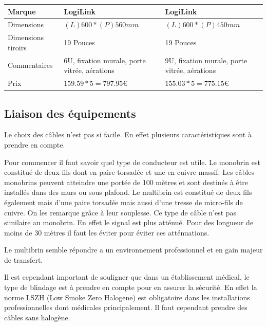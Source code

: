     \begin{center}
        \begin{tabular}{|l|p{5cm}|p{5cm}|}
          \hline
            Marque  & LogiLink
    &   LogiLink
 \\
          \hline
Dimensions
  &
$(L)600 * (P)560 mm$
    & $ (L)600 * (P)450 mm $

 \\
          \hline
Dimensions tiroirs
  & 19 Pouces
    & 19 Pouces
 \\
          \hline
            Commentaires   & 6U, fixation murale, porte vitrée, aérations & 9U, fixation murale, porte vitrée, aérations
                  \\
        \hline
            Prix &
$ 159.59 * 5 = 797.95  \euro   $
    &
$ 155.03 * 5 = 775.15 \euro   $
 \\
          \hline
        \end{tabular}
    \end{center}





\subsection{Liaison des équipements}

Le choix des câbles n'est pas si facile. En effet plusieurs caractéristiques sont à prendre en compte.

Pour commencer il faut savoir quel type de conducteur est utile.
Le monobrin est constitué de deux fils dont en paire torsadée et une en cuivre massif. Les câbles monobrins peuvent atteindre une portée de 100 mètres et sont destinés à être installés dans des murs ou sous plafond.
Le multibrin est constitué de deux fils également mais d'une paire torsadée mais aussi d'une tresse de micro-fils de cuivre. On les remarque grâce à leur souplesse. Ce type de câble n'est pas similaire au monobrin. En effet le signal est plus atténué. Pour des longueur de moins de 30 mètres il faut les éviter pour éviter ces atténuations.

Le multibrin semble répondre a un environnement professionnel et en gain majeur de transfert.

Il est cependant important de souligner que dans un établissement médical, le type de blindage est à prendre en compte pour en assurer la sécurité. En effet la norme LSZH (Low Smoke Zero Halogene) est obligatoire dans les installations professionnelles dont médicales principalement. Il faut cependant prendre des câbles sans halogène.

